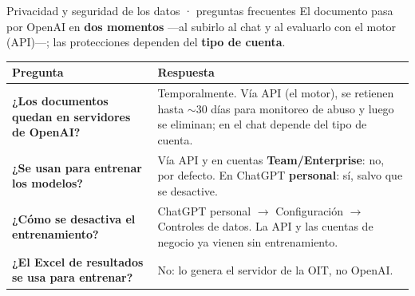 \documentclass[aspectratio=169,11pt]{beamer}
\newcommand{\bluelead}[1]{\textbf{\color{iloBlue}#1}}
\begin{document}
\begin{frame}{Privacidad y seguridad de los datos · preguntas frecuentes}
  \small
  El documento pasa por OpenAI en \bluelead{dos momentos} —al subirlo al chat y al evaluarlo con el motor (API)—; las protecciones dependen del \bluelead{tipo de cuenta}.
  \vspace{0.15cm}
  \renewcommand{\arraystretch}{1.2}
  \begin{tabular}{@{}p{4.8cm}p{7.4cm}@{}}
    \toprule
    \rowcolor{iloBlue}\color{white}\textbf{Pregunta} & \color{white}\textbf{Respuesta}\\
    \midrule
    \bluelead{¿Los documentos quedan en servidores de OpenAI?} & Temporalmente. Vía API (el motor), se retienen hasta $\sim$30 días para monitoreo de abuso y luego se eliminan; en el chat depende del tipo de cuenta.\\
    \rowcolor{iloGrayLt}\bluelead{¿Se usan para entrenar los modelos?} & Vía API y en cuentas \textbf{Team/Enterprise}: no, por defecto. En ChatGPT \textbf{personal}: sí, salvo que se desactive.\\
    \bluelead{¿Cómo se desactiva el entrenamiento?} & ChatGPT personal $\to$ Configuración $\to$ Controles de datos. La API y las cuentas de negocio ya vienen sin entrenamiento.\\
    \rowcolor{iloGrayLt}\bluelead{¿El Excel de resultados se usa para entrenar?} & No: lo genera el servidor de la OIT, no OpenAI.\\
    \bottomrule
  \end{tabular}
\end{frame}
\end{document}

